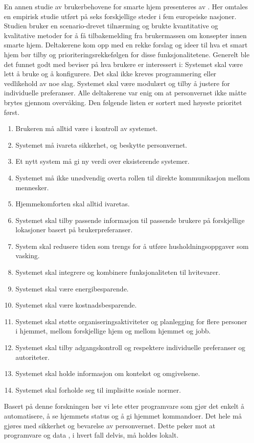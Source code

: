 {En annen studie av brukerbehovene for smarte hjem presenteres av \citet{userreq}. Her omtales en empirisk studie utført på seks forskjellige steder i fem europeiske nasjoner. Studien bruker en scenario-drevet tilnærming og brukte kvantitative og kvalitative metoder for å få tilbakemelding fra brukermassen om konsepter innen smarte hjem. Deltakerene kom opp med en rekke forslag og ideer til hva et smart hjem bør tilby og prioriteringsrekkefølgen for disse funksjonalitetene. Generelt ble det funnet godt med beviser på hva brukere er interessert i: Systemet skal være lett å bruke og å konfigurere. Det skal ikke kreves programmering eller vedlikehold av noe slag. Systemet skal være modulært og tilby å justere for individuelle preferanser. Alle deltakerene var enig om at personvernet ikke måtte brytes gjennom overvåking. Den følgende listen er sortert med høyeste prioritet først.
\begin{enumerate}
  \item Brukeren må alltid være i kontroll av systemet.
  \item Systemet må ivareta sikkerhet, og beskytte personvernet.
  \item Et nytt system må gi ny verdi over eksisterende systemer.
  \item Systemet må ikke unødvendig overta rollen til direkte kommunikasjon mellom mennesker.
  \item Hjemmekomforten skal alltid ivaretas.
  \item Systemet skal tilby passende informasjon til passende brukere på forskjellige lokasjoner basert på brukerpreferanser.
  \item System skal redusere tiden som trengs for å utføre husholdningsoppgaver som vasking.
  \item Systemet skal integrere og kombinere funksjonaliteten til hvitevarer.
  \item Systemet skal være energibesparende.
  \item Systemet skal være kostnadsbesparende.
  \item Systemet skal støtte organiseringsaktiviteter og planlegging for flere personer i hjemmet, mellom forskjellige hjem og mellom hjemmet og jobb.
  \item Systemet skal tilby adgangskontroll og respektere individuelle preferanser og autoriteter.
  \item Systemet skal holde informasjon om kontekst og omgivelsene.
  \item Systemet skal forholde seg til implisitte sosiale normer.
\end{enumerate}

Basert på denne forskningen bør vi lete etter programvare som gjør det enkelt å automatisere, å se hjemmets status og å gi hjemmet kommandoer. Det hele må gjøres med sikkerhet og bevarelse av personvernet. Dette peker mot at programvare og data , i hvert fall delvis, må holdes lokalt.
}

